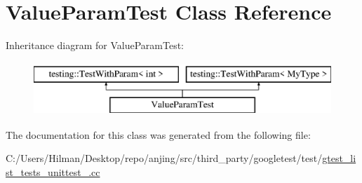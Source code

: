 \hypertarget{class_value_param_test}{}\section{Value\+Param\+Test Class Reference}
\label{class_value_param_test}
Inheritance diagram for Value\+Param\+Test\+:\begin{figure}[H]
\begin{center}
\leavevmode
\includegraphics[height=2.000000cm]{class_value_param_test}
\end{center}
\end{figure}


The documentation for this class was generated from the following file\+:\begin{DoxyCompactItemize}
\item 
C\+:/\+Users/\+Hilman/\+Desktop/repo/anjing/src/third\+\_\+party/googletest/test/\hyperlink{gtest__list__tests__unittest___8cc}{gtest\+\_\+list\+\_\+tests\+\_\+unittest\+\_\+.\+cc}\end{DoxyCompactItemize}

